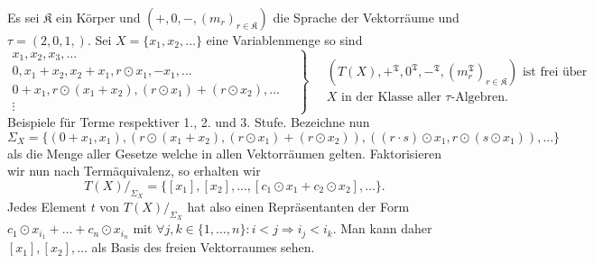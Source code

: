 \begin{example}
    Es sei $\mathfrak{K}$ ein Körper und $(+,0,-,(m_r)_{r\in\mathfrak{K}})$ die Sprache der Vektorräume und $\tau=(2,0,1,)$. Sei
    $X=\{x_1,x_2,\ldots\}$ eine Variablenmenge so sind
    $$ \left. \begin{matrix} x_1, x_2, x_3, ... \\ 0, x_1 + x_2, x_2 + x_1, r\odot x_1, -x_1, ... \\ 0 + x_1, r\odot (x_1+x_2), (r\odot x_1) + (r\odot x_2), ... \\ \vdots \end{matrix} \quad \right\} \quad \begin{matrix} (T(X), +^\mathfrak{T}, 0^\mathfrak{T}, -^\mathfrak{T},(m^\mathfrak{T}_r)_{r\in\mathfrak{K}}) \textrm{ ist frei über} \\ X \textrm{ in der Klasse aller $\tau$-Algebren.} \end{matrix} $$
    Beispiele für Terme respektiver 1., 2. und 3. Stufe. Bezeichne nun
    $$ \Sigma_X = \{ (0 + x_1, x_1), (r \odot (x_1+x_2), (r\odot x_1)+(r\odot x_2)), ((r\cdot s)\odot x_1, r\odot(s\odot x_1)), ... \} $$
    als die Menge aller Gesetze welche in allen Vektorräumen gelten. Faktorisieren wir nun nach Termäquivalenz, so erhalten wir
    $$ T(X) /_{\Sigma_X} = \{ [x_1], [x_2], ..., [c_1\odot x_1 + c_2\odot x_2],... \}. $$
    Jedes Element $t$ von $T(X) /_{\Sigma_X}$ hat also einen Repräsentanten der Form $c_1\odot x_{i_1}+\ldots +c_n\odot x_{i_n}$ mit $\forall j,k\in\{1,\ldots,n\}:i<j\Rightarrow i_j<i_k$.
    Man kann daher $[x_1],[x_2],\ldots$ als Basis des freien Vektorraumes sehen.
\end{example}
